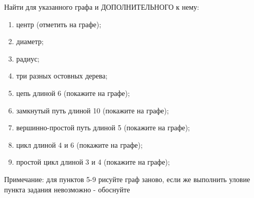 \question
Найти для указанного графа и ДОПОЛНИТЕЛЬНОГО к нему:
\begin{enumerate}
\item  центр (отметить на графе);
\item  диаметр;
\item  радиус;
\item  три разных остовных дерева;
\item  цепь длиной 6 (покажите на графе);
\item  замкнутый путь длиной 10 (покажите на графе);
\item  вершинно-простой путь длиной 5 (покажите на графе);
\item  цикл длиной 4 и 6 (покажите на графе);
\item  простой цикл длиной 3 и 4 (покажите на графе);
\end{enumerate}
Примечание: для пунктов 5-9 рисуйте граф заново, если же выполнить уловие пункта задания невозможно  - обоснуйте 
\begin{figure}[h]

\begin{minipage}[h]{0.55\linewidth}
\end{minipage}
\begin{minipage}[h]{0.45\linewidth}
\end{minipage}
\end{figure}


